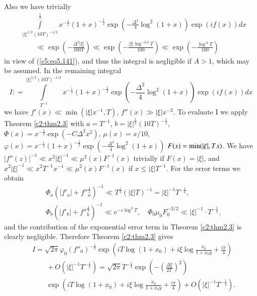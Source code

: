 Also we have trivially
\begin{align*}
& \int\limits^{\frac{1}{2}}_{|\xi|^{1/2} (10T)^{-1/2}}
  x^{-\frac{1}{2}} (1+x)^{-\frac{1}{2}} \exp \left(
  -\frac{\Delta^2}{4} \log^2 (1+x)\right) \exp (if (x)) dx\\ 
& \qquad \ll \exp \left(-\frac{\Delta^2 |\xi|}{100 T} \right) \ll \exp
  \left(-\frac{|\xi| \log^{-2A} T}{100} \right) \ll \exp
  \left(-\frac{\log^A T}{100}  \right) 
\end{align*}
in view of (\ref{c5:eq5.141}), and thus the integral is negligible if
$A >1$, which may be assumed. In the remaining integral 
$$ 
I : = \int\limits^{|\xi|^{1/2} (10T)^{-1/2}}_{T^{-1}} x^{-\frac{1}{2}}
(1+x)^{-\frac{1}{2}} \exp \left(-\frac{\Delta^2}{4} \log^2  (1+x)
\right) \exp (if (x)) dx 
$$
we have $f'(x) \ll \min (|\xi| x^{-1}, T)$, $f''(x) \gg |\xi|
x^{-2}$. To evaluate I we apply Theorem \ref{c2:thm2.3} with $a =
T^{-1}$, $b = |\xi|^{\frac{1}{2}} (10T)^{-\frac{1}{2}}$, $\Phi(x) =
x^{-\frac{1}{2}} \exp (-C \Delta^2 x^2)$, $\mu (x) = x/10$,
$\varphi(x) = x^{-\frac{1}{2}} (1+x)^{-\frac{1}{2}} \exp
\left(-\frac{\Delta^2}{4} \log^2 (1+x)  \right)$ $F (x) =\break \min (|\xi|,
Tx)$.  We have $|f''(z)|^{-1} \ll x^2 |\xi|^{-1} \ll \mu^2 (x)
F^{-1}(x)$ trivially if $F(x) = |\xi|$, and $x^2 |\xi|^{-1} \ll x^2
T^{-1} x^{-1} \ll \mu^2 (x) F^{-1} (x)$ if $x \leq |\xi|T^{-1}$. For
the error terms we obtain 
\begin{align*}
& \Phi_a \left(|f'_a| + {f''}_a^{\frac{1}{2}}\right)^{-1} \ll T^{\frac{1}{2}}
  (|\xi|T)^{-1} = |\xi|^{-1} T^{-\frac{1}{2}},\\ 
& \Phi_b \left(|f'_b| + f''^{\frac{1}{2}}_b\right)^{-1} \ll e^{-c\log^2
    T},\quad \Phi_0 \mu_0 F^{-3/2}_0 \ll |\xi|^{-1} \cdot T^{-\frac{1}{2}},  
\end{align*}\pageoriginale
and the contribution of the exponential error term in Theorem
\ref{c2:thm2.3} is clearly negligible. Therefore Theorem
\ref{c2:thm2.3} gives 
\begin{align*}
& I = \sqrt{2\pi} \varphi_0 (f''_0)^{-\frac{1}{2}} \exp \left(iT \log 
  (1+x_0) + i\xi \log \frac{x_0}{1+x_0y} + \frac{i\pi}{4}\right)\\ 
&\qquad {}+ O \left(|\xi|^{-1} T^{-\frac{1}{2}}\right)= \sqrt{2\pi}
  T^{-\frac{1}{2}} \exp \left(- \left(\frac{\Delta 
    \xi}{2T} \right)^2 \right) \\ 
&\qquad \exp \left(iT \log (1+x_0) + i \xi \log \frac{x_0}{1+x_0 y}  +
  \frac{i\pi}{4} \right) + O \left(|\xi|^{-1} T^{-\frac{1}{2}}\right). 
\end{align*}

